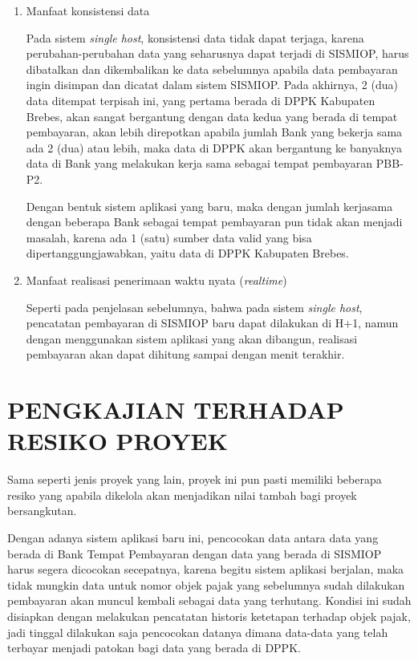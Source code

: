\documentclass[pdftex, 12pt, oneside]{article}
\begin{document}
\begin{enumerate}[1.]
  \item Manfaat konsistensi data
  
  Pada sistem \textit{single host}, konsistensi data tidak dapat terjaga, karena perubahan-perubahan data yang seharusnya dapat terjadi di SISMIOP, harus dibatalkan dan dikembalikan ke data sebelumnya apabila data pembayaran ingin disimpan dan dicatat dalam sistem SISMIOP. Pada akhirnya, 2 (dua) data ditempat terpisah ini, yang pertama berada di DPPK Kabupaten Brebes, akan sangat bergantung dengan data kedua yang berada di tempat pembayaran, akan lebih direpotkan apabila jumlah Bank yang bekerja sama ada 2 (dua) atau lebih, maka data di DPPK akan bergantung ke banyaknya data di Bank yang melakukan kerja sama sebagai tempat pembayaran PBB-P2.
  
  Dengan bentuk sistem aplikasi yang baru, maka dengan jumlah kerjasama dengan beberapa Bank sebagai tempat pembayaran pun tidak akan menjadi masalah, karena ada 1 (satu) sumber data valid yang bisa dipertanggungjawabkan, yaitu data di DPPK Kabupaten Brebes.
  
  \item Manfaat realisasi penerimaan waktu nyata (\textit{realtime})
  
  Seperti pada penjelasan sebelumnya, bahwa pada sistem \textit{single host}, pencatatan pembayaran di SISMIOP baru dapat dilakukan di H+1, namun dengan menggunakan sistem aplikasi yang akan dibangun, realisasi pembayaran akan dapat dihitung sampai dengan menit terakhir.
\end{enumerate}

\section{PENGKAJIAN TERHADAP RESIKO PROYEK}

Sama seperti jenis proyek yang lain, proyek ini pun pasti memiliki beberapa resiko yang apabila dikelola akan menjadikan nilai tambah bagi proyek bersangkutan.

Dengan adanya sistem aplikasi baru ini, pencocokan data antara data yang berada di Bank Tempat Pembayaran dengan data yang berada di SISMIOP harus segera dicocokan secepatnya, karena begitu sistem aplikasi berjalan, maka tidak mungkin data untuk nomor objek pajak yang sebelumnya sudah dilakukan pembayaran akan muncul kembali sebagai data yang terhutang. Kondisi ini sudah disiapkan dengan melakukan pencatatan historis ketetapan terhadap objek pajak, jadi tinggal dilakukan saja pencocokan datanya dimana data-data yang telah terbayar menjadi patokan bagi data yang berada di DPPK.
\end{document}
